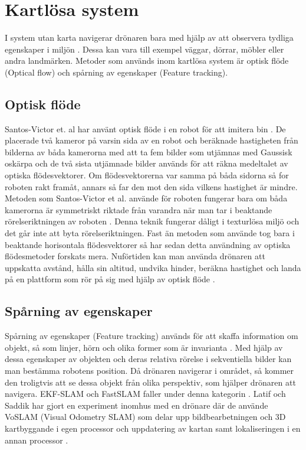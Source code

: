 \section{Kartlösa system}

I system utan karta navigerar drönaren bara med hjälp av att observera tydliga egenskaper i miljön \citep{982903}. Dessa kan vara till exempel väggar, dörrar, möbler eller andra landmärken. Metoder som används inom kartlösa system är optisk flöde (Optical flow) och spårning av egenskaper (Feature tracking). 

\subsection{Optisk flöde}

Santos-Victor et. al har använt optisk flöde i en robot för att imitera bin \citep{341094}. De placerade två kameror på varsin sida av en robot och beräknade hastigheten från bilderna av båda kamerorna med att ta fem bilder som utjämnas med Gaussisk oskärpa och de två sista utjämnade bilder används för att räkna medeltalet av optiska flödesvektorer. Om flödesvektorerna var samma på båda sidorna så for roboten rakt framåt, annars så far den mot den sida vilkens hastighet är mindre. Metoden som Santos-Victor et al. använde för roboten fungerar bara om båda kamerorna är symmetriskt riktade från varandra när man tar i beaktande rörelseriktningen av roboten \citep{982903}. Denna teknik fungerar dåligt i texturlösa miljö och det går inte att byta rörelseriktningen. Fast än metoden som \cite{341094} använde tog bara i beaktande horisontala flödesvektorer så har sedan detta användning av optiska flödesmetoder forskats mera. Nuförtiden kan man använda drönaren att uppskatta avstånd, hålla sin altitud, undvika hinder, beräkna hastighet och landa på en plattform som rör på sig med hjälp av optisk flöde \citep{6564752}.

\subsection{Spårning av egenskaper}

Spårning av egenskaper (Feature tracking) används för att skaffa information om objekt, så som linjer, hörn och olika former som är invarianta \citep{geospatial}. Med hjälp av dessa egenskaper av objekten och deras relativa rörelse i sekventiella bilder kan man bestämma robotens position. Då drönaren navigerar i området, så kommer den troligtvis att se dessa objekt från olika perspektiv, som hjälper drönaren att navigera. EKF-SLAM och FastSLAM faller under denna kategorin \citep{8930783}. Latif och Saddik har gjort en experiment inomhus med en drönare där de använde VoSLAM (Visual Odometry SLAM) som delar upp bildbearbetningen och 3D kartbyggande i egen processor och uppdatering av kartan samt lokaliseringen i en annan processor \citep{8930783}.

